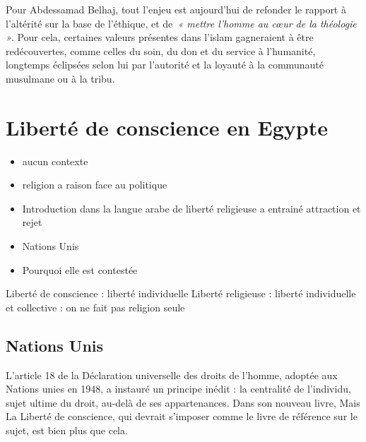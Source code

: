 Pour Abdessamad Belhaj, tout l'enjeu est aujourd'hui de refonder le
rapport à l'altérité sur la base de l'éthique, et de\emph{~« mettre
l'homme au cœur de la théologie »}. Pour cela, certaines valeurs
présentes dans l'islam gagneraient à être redécouvertes, comme celles du
soin, du don et du service à l'humanité, longtemps éclipsées selon lui
par l'autorité et la loyauté à la communauté musulmane ou à la tribu.


\section{Liberté de conscience en Egypte}

\begin{Def}[Intégralisme]
\begin{itemize}
    \item aucun contexte
    \item religion a raison face au politique
\end{itemize}
\end{Def}

 
\begin{itemize}
    \item Introduction dans la langue arabe de liberté religieuse a entrainé attraction et rejet
\item Nations Unis
\item Pourquoi elle est contestée
\end{itemize}

\begin{Prop}
Liberté de conscience : liberté individuelle
Liberté religieuse : liberté individuelle et collective : on ne fait pas religion seule
\end{Prop}


\subsection{Nations Unis}
\begin{quote}
    
\end{quote}
 L’article 18 de la Déclaration universelle des droits de l’homme, adoptée aux Nations unies en 1948, a instauré un principe inédit : la centralité de l’individu, sujet ultime du droit, au-delà de ses appartenances. Dans son nouveau livre,  Mais La Liberté de conscience, qui devrait s’imposer comme le livre de référence sur le sujet, est bien plus que cela.

